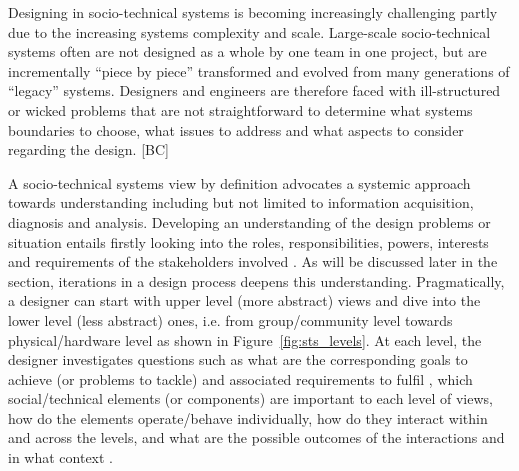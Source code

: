  Designing in socio-technical systems is becoming increasingly challenging partly due to the increasing systems complexity and scale.  
Large-scale socio-technical systems often are not designed as a whole by one team in one project, but are incrementally ``piece by piece'' transformed and evolved from many generations of ``legacy'' systems. Designers and engineers are therefore faced with ill-structured or wicked problems that are not straightforward to determine what systems boundaries to choose, what issues to address and what aspects to consider regarding the design. [BC]

A socio-technical systems view by definition advocates a systemic approach towards understanding including but not limited to information acquisition, diagnosis and analysis. Developing an understanding of the design problems or situation entails firstly looking into the roles, responsibilities, powers, interests and requirements of the stakeholders involved \cite{Checkland1981}. As will be discussed later in the section, iterations in a design process deepens this understanding. 
Pragmatically, a designer can start with upper level (more abstract) views and dive into the lower level (less abstract) ones, i.e. from group/community level towards physical/hardware level as shown in Figure~\ref{fig:sts_levels}.
At each level, the designer investigates questions such as what are the corresponding goals to achieve (or problems to tackle) \cite{Checkland1981,Waterson2002} and associated requirements to fulfil \cite{Whitworth2009a}, which social/technical elements (or components) are important to each level of views, how do the elements operate/behave individually, how do they interact within and across the levels, and what are the possible outcomes of the interactions and in what context \cite{Baxter2011}. 

